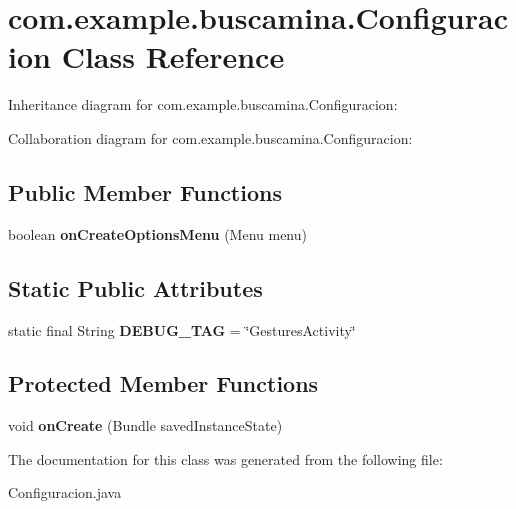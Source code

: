 \section{com.\-example.\-buscamina.\-Configuracion Class Reference}
\label{classcom_1_1example_1_1buscamina_1_1_configuracion}


Inheritance diagram for com.\-example.\-buscamina.\-Configuracion\-:


Collaboration diagram for com.\-example.\-buscamina.\-Configuracion\-:
\subsection*{Public Member Functions}
\begin{DoxyCompactItemize}
\item 
boolean {\bfseries on\-Create\-Options\-Menu} (Menu menu)\label{classcom_1_1example_1_1buscamina_1_1_configuracion_a2ec77b2a8ced2bff3aaec19534142cad}

\end{DoxyCompactItemize}
\subsection*{Static Public Attributes}
\begin{DoxyCompactItemize}
\item 
static final String {\bfseries D\-E\-B\-U\-G\-\_\-\-T\-A\-G} = \char`\"{}Gestures\-Activity\char`\"{}\label{classcom_1_1example_1_1buscamina_1_1_configuracion_a788f80f6991df1fc4fb5068d9888626d}

\end{DoxyCompactItemize}
\subsection*{Protected Member Functions}
\begin{DoxyCompactItemize}
\item 
void {\bfseries on\-Create} (Bundle saved\-Instance\-State)\label{classcom_1_1example_1_1buscamina_1_1_configuracion_afa2974bc19e80ff18d66b48cffb8c2a8}

\end{DoxyCompactItemize}


The documentation for this class was generated from the following file\-:\begin{DoxyCompactItemize}
\item 
Configuracion.\-java\end{DoxyCompactItemize}
